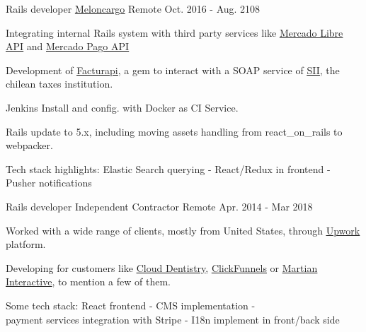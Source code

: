 \begin{cventries}
  \cventry
    {Rails developer} %
    {\href{https://www.crunchbase.com/organization/meloncargo}{\underline{Meloncargo}}} %
    {Remote} %
    {Oct. 2016 - Aug. 2108} %
    {
      \begin{cvitems} %
        \item { Integrating internal Rails system with third party services like
                \href{https://developers.mercadolibre.com/}{\underline{Mercado Libre API}} and
                \href{https://www.mercadopago.com.ar/developers/es/reference}{\underline{Mercado Pago API}} }
        \item { Development of \href{https://github.com/meloncargo/facturapi}{\underline{Facturapi}},
                a gem to interact with a SOAP service of \href{https://www.sii.cl}{\underline{SII}},
                the chilean taxes institution. }
        \item { Jenkins Install and config. with Docker as CI Service. }
        \item { Rails update to 5.x, including moving assets handling from react\_on\_rails to webpacker. }
        \item { Tech stack highlights: Elastic Search querying - React/Redux in frontend - Pusher notifications }
      \end{cvitems}
    }

  \cventry
    {Rails developer} %
    {Independent Contractor} %
    {Remote} %
    {Apr. 2014 - Mar 2018} %
    {
      \begin{cvitems} %
        \item { Worked with a wide range of clients, mostly from United States, through
                \href{https://www.upwork.com/freelancers/~0165692cc0b947512e}{\underline{Upwork}} platform.}
        \item { Developing for customers like
                \href{https://www.clouddentistry.com/}{\underline{Cloud Dentistry}},
                \href{https://www.clickfunnels.com/}{\underline{ClickFunnels}} or
                \href{https://martianinteractive.com/}{\underline{Martian Interactive}},
                to mention a few of them.}
        \item { Some tech stack: React frontend - CMS implementation - \\
                payment services integration with Stripe - I18n implement in front/back side}
      \end{cvitems}
    }


\end{cventries}
